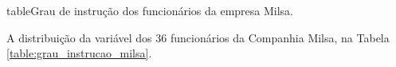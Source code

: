 \documentclass[11pt,fleqn]{book}
\numberwithin{mpicture}{chapter}
\numberwithin{mtable}{chapter}
\numberwithin{mframe}{chapter}
\begin{document}
\begin{pageWidthArea}
	\begin{pageWidthAreaPicture}{table}{Grau de instrução dos funcionários da empresa Milsa.}
		\label{table:grau_instrucao_milsa}
		\hspace{-15pt}
	\end{pageWidthAreaPicture}
\end{pageWidthArea}

\begin{example}
	A distribuição da variável  dos 36 funcionários da Companhia Milsa, na Tabela \ref{table:grau_instrucao_milsa}.
\end{example}
\end{document}
